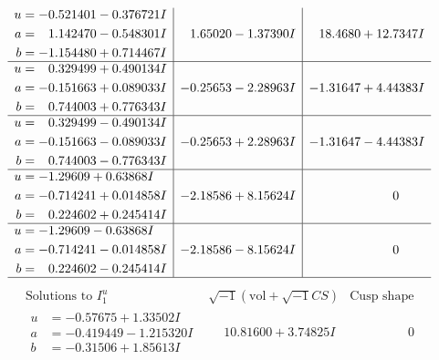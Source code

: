 \documentclass[1p]{elsarticle_modified}
\theoremstyle{definition}
\newcommand{\I}{\sqrt{-1}}
\begin{document}
$$\begin{array}{c|c|c}
\begin{aligned}
u &= -0.521401 - 0.376721 I \\
a &= \phantom{-}1.142470 - 0.548301 I \\
b &= -1.154480 + 0.714467 I\end{aligned}
 & \phantom{-}1.65020 - 1.37390 I & \phantom{-}18.4680 + 12.7347 I \\ \hline\begin{aligned}
u &= \phantom{-}0.329499 + 0.490134 I \\
a &= -0.151663 + 0.089033 I \\
b &= \phantom{-}0.744003 + 0.776343 I\end{aligned}
 & -0.25653 - 2.28963 I & -1.31647 + 4.44383 I \\ \hline\begin{aligned}
u &= \phantom{-}0.329499 - 0.490134 I \\
a &= -0.151663 - 0.089033 I \\
b &= \phantom{-}0.744003 - 0.776343 I\end{aligned}
 & -0.25653 + 2.28963 I & -1.31647 - 4.44383 I \\ \hline\begin{aligned}
u &= -1.29609 + 0.63868 I \\
a &= -0.714241 + 0.014858 I \\
b &= \phantom{-}0.224602 + 0.245414 I\end{aligned}
 & -2.18586 + 8.15624 I & \phantom{-0.000000 } 0 \\ \hline\begin{aligned}
u &= -1.29609 - 0.63868 I \\
a &= -0.714241 - 0.014858 I \\
b &= \phantom{-}0.224602 - 0.245414 I\end{aligned}
 & -2.18586 - 8.15624 I & \phantom{-0.000000 } 0\\
 \hline 
 \end{array}$$\newpage$$\begin{array}{c|c|c}  
\text{Solutions to }I^u_{1}& \I (\text{vol} + \sqrt{-1}CS) & \text{Cusp shape}\\
 \hline 
\begin{aligned}
u &= -0.57675 + 1.33502 I \\
a &= -0.419449 - 1.215320 I \\
b &= -0.31506 + 1.85613 I\end{aligned}
 & \phantom{-}10.81600 + 3.74825 I & \phantom{-0.000000 } 0 \\ \hline\begin{aligned}

\end{aligned}
\end{array}$$
\end{document}
